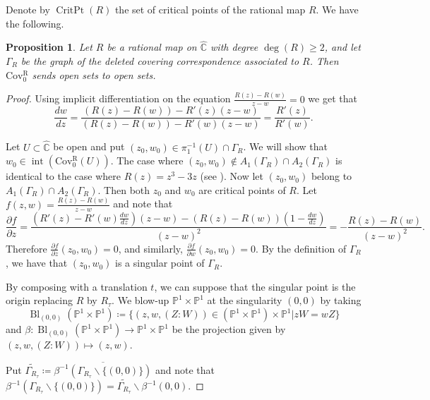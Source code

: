 \documentclass[11pt,letterpaper]{article}
\newtheorem{proposition}[theorem]{Proposition}
\theoremstyle{definition}
\def\covr{\operatorname{Cov^R_0}}
\def\critpt{\operatorname{CritPt}}
\def\interior{\operatorname{int}}
\def\blow{\operatorname{Bl}}
\begin{document}
Denote by $\critpt(R)$ the set of critical points of the rational map $R$. We have the following.
\begin{proposition}\label{critical} 
Let $R$ be a rational map on $\widehat{\mathbb{C}}$ with degree $\deg(R)\geq 2$, and let $\Gamma_R$ be the graph of the deleted covering correspondence associated to $R$. Then $\covr$ sends open sets to open sets.
\end{proposition}
\begin{proof}
Using implicit differentiation on the equation $\frac{R(z)-R(w)}{z-w}=0$ we get that
$$\frac{dw}{dz}=\frac{(R(z)-R(w))-R'(z)(z-w)}{(R(z)-R(w))-R'(w)(z-w)}=\frac{R'(z)}{R'(w)}.$$

Let $U\subset\widehat{\mathbb{C}}$ be open and put $(z_0,w_0)\in\pi_1^{-1}(U)\cap\Gamma_R$. We will show that $w_0\in\interior(\covr(U))$. The case where $(z_0,w_0)\notin A_1(\Gamma_R)\cap A_2(\Gamma_R)$ is identical to the case where $R(z)=z^3-3z$ (see \cite[Remark 2.6]{Mat23}). Now let $(z_0,w_0)$ belong to $A_1(\Gamma_R)\cap A_2(\Gamma_R)$. Then both $z_0$ and $w_0$ are critical points of $R$. Let $f(z,w)=\frac{R(z)-R(w)}{z-w}$ and note that
$$\frac{\partial f}{\partial z}=\frac{(R'(z)-R'(w)\frac{dw}{dz})(z-w)-(R(z)-R(w))(1-\frac{dw}{dz})}{(z-w)^2}=-\frac{R(z)-R(w)}{(z-w)^2}.$$
Therefore $\frac{\partial f}{\partial z}(z_0,w_0)=0$, and similarly, $\frac{\partial f}{\partial w}(z_0,w_0)=0$. By the definition of $\Gamma_R$, we have that $(z_0,w_0)$ is a singular point of $\Gamma_R$.

By composing with a translation $t$, we can suppose that the singular point is the origin replacing $R$ by $R_\tau$. We blow-up $\mathbb{P}^1\times\mathbb{P}^1$ at the singularity $(0,0)$ by taking
$$\blow_{(0,0)}(\mathbb{P}^1\times\mathbb{P}^1)\coloneqq\lbrace (z,w,(Z:W))\in (\mathbb{P}^1\times\mathbb{P}^1)\times\mathbb{P}^1 |zW=wZ\rbrace$$
and $\beta:\blow_{(0,0)}(\mathbb{P}^1 \times\mathbb{P}^1)\to\mathbb{P}^1\times\mathbb{P}^1$ be the projection given by $(z,w,(Z:W))\mapsto (z,w)$. 

Put $\widetilde{\Gamma_{R_\tau}}\coloneqq\overline{\beta^{-1}(\Gamma_{R_\tau}\smallsetminus\lbrace (0,0)\rbrace)}$ and note that $\beta^{-1}(\Gamma_{R_\tau}\smallsetminus\lbrace(0,0)\rbrace)=\widetilde{\Gamma_{R_\tau}}\smallsetminus\beta^{-1}(0,0)$.



\end{proof}
\end{document}

